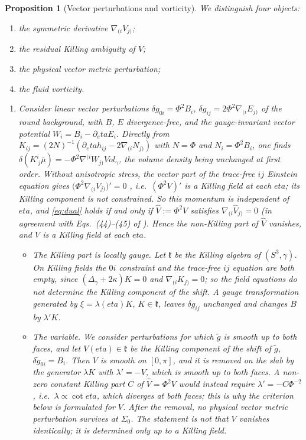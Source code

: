 \documentclass[11pt]{article}
\theoremstyle{canonmath}
\theoremstyle{canonpostulate}
\theoremstyle{canonproposition}
\theoremstyle{canonmath}
\newtheorem{proposition*}[theorem]{Proposition}
\theoremstyle{canonproposition}
\def\mathrm#1{#1}%
\def\mathcal#1{#1}%
\def\eta{eta}%
\begin{document}
\begin{proposition*}[Vector perturbations and vorticity]\label{prop:vector}
We distinguish four objects:
\begin{enumerate}[label=(\alph*)]
\item the symmetric derivative $\nabla_{(i}\mathcal V_{j)}$;
\item the residual Killing ambiguity of $\mathcal V$;
\item the physical vector metric perturbation;
\item the fluid vorticity.
\end{enumerate}
\begin{enumerate}[label=(\roman*)]
\item Consider linear vector perturbations $\delta g_{0i} = \Phi^2B_i$, $\delta g_{ij} = 2\Phi^2\nabla_{(i}E_{j)}$ of the round background, with $B$, $E$ divergence-free, and the gauge-invariant vector potential $\mathcal{W}_i = B_i - \partial_\eta E_i$. Directly from $K_{ij} = (2N)^{-1}(\partial_\eta h_{ij} - 2\nabla_{(i}N_{j)})$ with $N = \Phi$ and $N_i = \Phi^2B_i$, one finds $\delta(K^i_{\ j}\bar\mu) = -\Phi^2\nabla^{(i}\mathcal{W}_{j)}\mathrm{Vol}_\gamma$, the volume density being unchanged at first order. Without anisotropic stress, the vector part of the trace-free $ij$ Einstein equation gives $\bigl(\Phi^2\nabla_{(i}\mathcal V_{j)}\bigr)' = 0$ \cite{MFB1992}, i.e.\ $(\Phi^2\mathcal V)'$ is a Killing field at each $\eta$; its Killing component is not constrained. So this momentum is independent of $\eta$, and \eqref{eq:dual} holds if and only if $\widehat{\mathcal V} := \Phi^2\mathcal V$ satisfies $\nabla_{(i}\widehat{\mathcal V}_{j)} = 0$ (in agreement with Eqs.~(44)--(45) of \cite{TBT2026}). Hence the non-Killing part of $\widehat{\mathcal V}$ vanishes, and $\mathcal V$ is a Killing field at each $\eta$.
  \begin{itemize}
  \item \emph{The Killing part is locally gauge.} Let $\mathfrak k$ be the Killing algebra of $(S^3,\gamma)$. On Killing fields the $0i$ constraint and the trace-free $ij$ equation are both empty, since $(\Delta_\gamma+2\kappa)K = 0$ and $\nabla_{(i}K_{j)} = 0$; so the field equations do not determine the Killing component of the shift. A gauge transformation generated by $\xi = \lambda(\eta)K$, $K\in\mathfrak k$, leaves $\delta g_{ij}$ unchanged and changes $B$ by $\lambda'K$.
  \item \emph{The variable.} We consider perturbations for which $\tilde g$ is smooth up to both faces, and let $V(\eta)\in\mathfrak k$ be the Killing component of the shift of $\tilde g$, $\delta\tilde g_{0i} = B_i$. Then $V$ is smooth on $[0,\pi]$, and it is removed on the slab by the generator $\lambda K$ with $\lambda' = -V$, which is smooth up to both faces. A non-zero constant Killing part $C$ of $\widehat{\mathcal V} = \Phi^2\mathcal V$ would instead require $\lambda' = -C\Phi^{-2}$, i.e.\ $\lambda\propto\cot\eta$, which diverges at both faces; this is why the criterion below is formulated for $V$. After the removal, no physical vector metric perturbation survives at $\Sigma_0$. The statement is not that $\mathcal V$ vanishes identically; it is determined only up to a Killing field.

\end{itemize}
\end{enumerate}
\end{proposition*}
\end{document}
